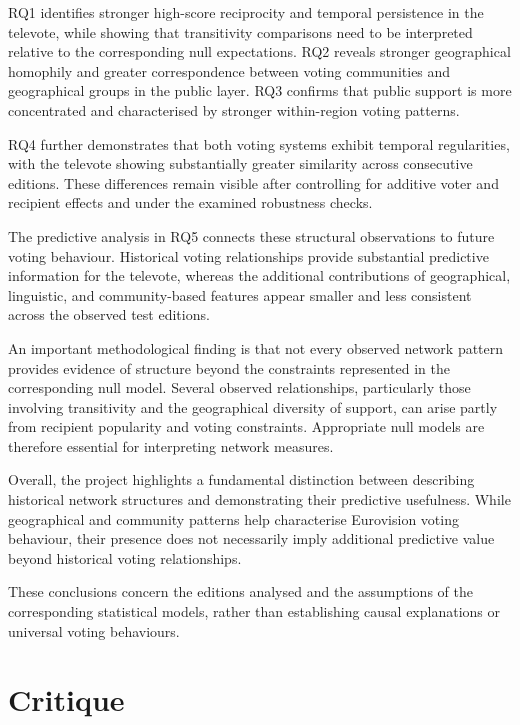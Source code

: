 \documentclass[12pt,a4paper]{article}
\begin{document}
RQ1 identifies
stronger high-score reciprocity and temporal
persistence in the televote, while showing
that transitivity comparisons need to be interpreted
relative to the corresponding null expectations.
RQ2 reveals stronger geographical homophily
and greater correspondence between voting
communities and geographical groups in the
public layer. RQ3 confirms that public support
is more concentrated and characterised by stronger
within-region voting patterns.

RQ4 further demonstrates that both voting
systems exhibit temporal regularities, with
the televote showing substantially greater
similarity across consecutive editions.
These differences remain visible after
controlling for additive voter and recipient
effects and under the examined robustness
checks.

The predictive analysis in RQ5 connects
these structural observations to future
voting behaviour. Historical voting
relationships provide substantial predictive
information for the televote, whereas the
additional contributions of geographical,
linguistic, and community-based features
appear smaller and less consistent across
the observed test editions.

An important methodological finding is that
not every observed network pattern provides evidence
of structure beyond the constraints represented
in the corresponding null model. Several
observed relationships, particularly those
involving transitivity and the geographical
diversity of support, can arise partly from
recipient popularity and voting constraints.
Appropriate null models are therefore
essential for interpreting network measures.

Overall, the project highlights a fundamental
distinction between describing historical
network structures and demonstrating their
predictive usefulness. While geographical
and community patterns help characterise
Eurovision voting behaviour, their presence
does not necessarily imply additional
predictive value beyond historical voting
relationships.

These conclusions concern the editions
analysed and the assumptions of the
corresponding statistical models, rather
than establishing causal explanations
or universal voting behaviours.




\section{Critique}
\label{critique}
\end{document}
